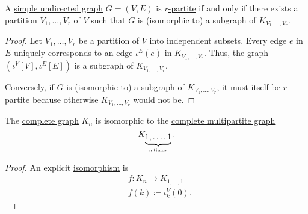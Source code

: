 \begin{proposition}\label{thm:complete_multipartite_subgraphs}
  A \hyperref[def:undirected_graph]{simple undirected graph} \( G = (V, E) \) is \hyperref[def:multipartite_graph]{\( r \)-partite} if and only if there exists a partition \( V_1, \ldots, V_r \) of \( V \) such that \( G \) is (isomorphic to) a subgraph of \( K_{V_1, \ldots, V_r} \).
\end{proposition}
\begin{proof}
  \SufficiencySubProof Let \( V_1, \ldots, V_r \) be a partition of \( V \) into independent subsets. Every edge \( e \) in \( E \) uniquely corresponds to an edge \( \iota^E(e) \) in \( K_{V_1, \ldots, V_r} \). Thus, the graph \( (\iota^V[V], \iota^E[E]) \) is a subgraph of \( K_{V_1, \ldots, V_r} \).

  \NecessitySubProof Conversely, if \( G \) is (isomorphic to) a subgraph of \( K_{V_1, \ldots, V_r} \), it must itself be \( r \)-partite because otherwise \( K_{V_1, \ldots, V_r} \) would not be.
\end{proof}

\begin{proposition}\label{thm:small_complete_multipartite_graph}
  The \hyperref[def:complete_graph]{complete graph} \( K_n \) is isomorphic to the \hyperref[def:complete_multipartite_graph]{complete multipartite graph}
  \begin{equation*}
    K_{\underbrace{1,\ldots,1}_{n \T*{times}}}.
  \end{equation*}
\end{proposition}
\begin{proof}
  An explicit \hyperref[def:undirected_graph/homomorphism]{isomorphism} is
  \begin{equation*}
    \begin{aligned}
      &f: K_n \to K_{1,\ldots,1} \\
      &f(k) \coloneqq \iota^V_k(0).
    \end{aligned}
  \end{equation*}
\end{proof}

